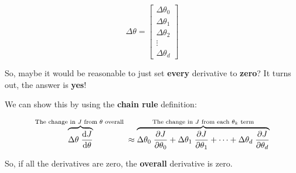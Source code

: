         \begin{equation}
            \Delta \theta =
            \begin{bmatrix}
                \Delta \theta_0 \\ \Delta \theta_1 \\ \Delta \theta_2 \\ \vdots \\ \Delta \theta_d
            \end{bmatrix}
        \end{equation}
        
        So, maybe it would be reasonable to just set \textbf{every} derivative to \textbf{zero}? It turns out, the answer is \textbf{yes}! 
        
        We can show this by using the \textbf{chain rule} definition:
        
        \begin{equation}
            \overbrace{
                \Delta \theta \; \frac{\dd J}{\dd \theta}} 
            ^{\text{The change in $J$ from $\theta$ overall } }
            \approx 
            \overbrace{
                \Delta \theta_0 \; \frac{\partial J}{\partial \theta_0} + \Delta \theta_1 \; \frac{\partial J}{\partial \theta_1} + \dots + \Delta \theta_d \; \frac{\partial J}{\partial \theta_d}
            }^{\text{The change in $J$ from each $\theta_k$ term} }
        \end{equation}
        
        So, if all the derivatives are zero, the \textbf{overall} derivative is zero.
        \\
        
